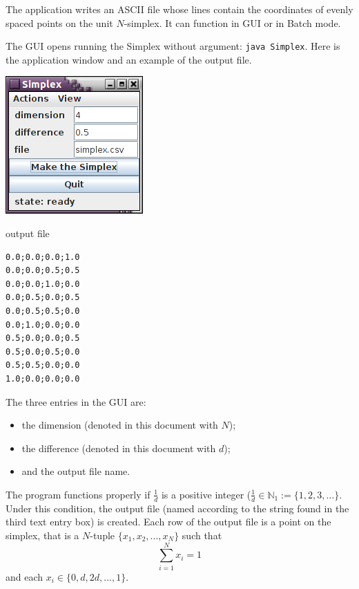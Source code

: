 \documentclass{jors}
\begin{document}
The application writes an ASCII file whose lines contain the coordinates of evenly spaced points on the unit $N$-simplex.  
It can function in GUI or in Batch mode.

The GUI opens running the Simplex without argument: \verb+java Simplex+.
Here is the application window and an example of the output file.

\vspace{1cm}

\begin{minipage}{0.5\textwidth}
\includegraphics[scale=1]{fig1.png}
\end{minipage}
\hspace{1cm}
\begin{minipage}{0.4\textwidth}
output file 

\begin{verbatim}
0.0;0.0;0.0;1.0
0.0;0.0;0.5;0.5
0.0;0.0;1.0;0.0
0.0;0.5;0.0;0.5
0.0;0.5;0.5;0.0
0.0;1.0;0.0;0.0
0.5;0.0;0.0;0.5
0.5;0.0;0.5;0.0
0.5;0.5;0.0;0.0
1.0;0.0;0.0;0.0
\end{verbatim}
\end{minipage}

\vspace{1cm}

The three entries in the GUI are: 
\begin{itemize}
\item the dimension (denoted in this document with $N$);
\item the difference (denoted in this document with $d$);
\item and the output file name.
\end{itemize}

The program functions properly if $\frac{1}{d}$ is a positive integer ($\frac{1}{d} \in \mathbb{N}_1:=\{1,2,3,\dots \}$.
Under this condition, the output file (named according to the string found in the third text entry box) is created. Each row of the output file is a point on the simplex, that is a $N$-tuple $\{x_1,x_2,...,x_N\}$ such that
\[
\sum_{i=1}^N x_i=1
\]
and each $x_i \in \{0,d,2d,...,1\}$.
\end{document}

